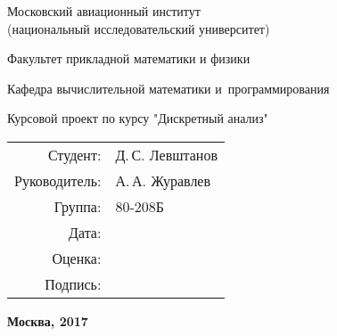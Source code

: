 \begin{titlepage}
\begin{center}
\bfseries

{\Large Московский авиационный институт\\ (национальный исследовательский университет)}

\vspace{48pt}

{\large Факультет прикладной математики и физики}

\vspace{36pt}

{\large Кафедра вычислительной математики и~программирования}

\vspace{48pt}

Курсовой проект по курсу "Дискретный анализ"
\end{center}

\vspace{72pt}

\begin{flushright}
\begin{tabular}{rl}
Студент: & Д.\,С. Левштанов\\
Руководитель: & А.\,А. Журавлев \\
Группа: & 80-208Б \\
Дата: & \\
Оценка: & \\
Подпись: & \\
\end{tabular}
\end{flushright}

\vfill

\begin{center}
\bfseries
Москва, 2017
\end{center}
\end{titlepage}

\pagebreak